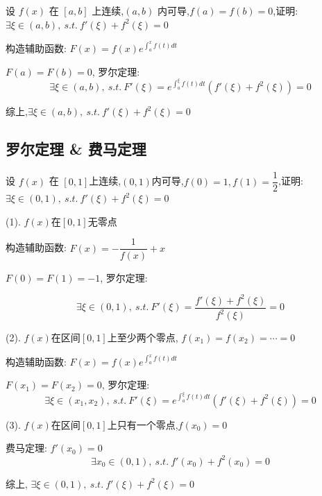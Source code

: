 \begin{proposition}
	设 $f(x)$ 在 $[a,b]$ 上连续,$(a,b)$ 内可导,$f(a)=f(b)=0$,证明: $\exists \xi\in(a,b),\ s.t.\ f'(\xi)+f^{2}(\xi)=0$
\end{proposition}
\begin{solution}

	构造辅助函数: $F(x)=f(x)e^{\int_{a}^{x}f(t)dt}$
	
	$F(a)=F(b)=0$, 罗尔定理:
	$$\exists \xi\in(a,b),\ s.t.\ F'(\xi)=e^{\int_{a}^{\xi}f(t)dt}(f'(\xi)+f^2(\xi))=0$$

	综上,$\exists \xi\in(a,b),\ s.t.\ f'(\xi)+f^{2}(\xi)=0$
\end{solution}

\subsection{罗尔定理 \& 费马定理}
\begin{proposition}
	设 $f(x)$ 在 $[0,1]$上连续,$(0,1)$内可导,$f(0)=1,f(1)=\dfrac{1}{2}$,证明: $\exists \xi\in(0,1),\ s.t.\ f'(\xi)+f^{2}(\xi)=0$
\end{proposition}
\begin{solution}

	(1). $f(x)$在$[0,1]$无零点

	构造辅助函数: $F(x)=-\dfrac{1}{f(x)}+x$
	
	$F(0)=F(1)=-1$, 罗尔定理:
	
	$$\exists \xi\in(0,1),\ s.t.\ F'(\xi)=\dfrac{f'(\xi)+f^{2}(\xi)}{f^2(\xi)}=0$$

	(2). $f(x)$在区间$[0,1]$上至少两个零点, $f(x_{1})=f(x_{2})=\cdots=0$

	构造辅助函数: $F(x)=f(x)e^{\int_{a}^{x}f(t)dt}$
	
	$F(x_{1})=F(x_{2})=0$, 罗尔定理:
	$$\exists \xi\in(x_{1},x_{2}),\ s.t.\ F'(\xi)=e^{\int_{a}^{\xi}f(t)dt}(f'(\xi)+f^2(\xi))=0$$

	(3). $f(x)$在区间$[0,1]$上只有一个零点,$f(x_{0})=0$

	费马定理: $f'(x_{0})=0$
	$$\exists x_{0}\in(0,1),\ s.t.\ f'(x_{0})+f^{2}(x_{0})=0$$

	综上, $\exists \xi\in(0,1),\ s.t.\ f'(\xi)+f^{2}(\xi)=0$
\end{solution}

